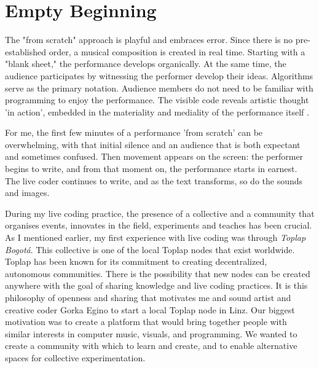 \documentclass[12pt, twoside, a4paper]{report}
\begin{document}
\section{Empty Beginning}


The "from scratch" approach is playful and embraces error. Since there is no pre-established order, a musical composition is created in real time. Starting with a "blank sheet," the performance develops organically. At the same time, the audience participates by witnessing the performer develop their ideas. Algorithms serve as the primary notation. Audience members do not need to be familiar with programming to enjoy the performance. The visible code reveals artistic thought 'in action', embedded in the materiality and mediality of the performance itself \citep{melete}.

For me, the first few minutes of a performance 'from scratch' can be overwhelming, with that initial silence and an audience that is both expectant and sometimes confused. Then movement appears on the screen: the performer begins to write, and from that moment on, the performance starts in earnest. The live coder continues to write, and as the text transforms, so do the sounds and images.

During my live coding practice, the presence of a collective and a community that organises events, innovates in the field, experiments and teaches has been crucial. As I mentioned earlier, my first experience with live coding was through \textit{Toplap Bogotá}. This collective is one of the local Toplap nodes that exist worldwide. Toplap has been known for its commitment to creating decentralized, autonomous communities. There is the possibility that new nodes can be created anywhere with the goal of sharing knowledge and live coding practices. It is this philosophy of openness and sharing that motivates me and sound artist and creative coder Gorka Egino to start a local Toplap node in Linz. Our biggest motivation was to create a platform that would bring together people with similar interests in computer music, visuals, and programming.  We wanted to create a community with which to learn and create, and to enable alternative spaces for collective experimentation. 
\end{document}
